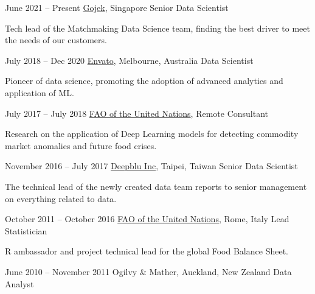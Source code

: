 \documentclass{tccv}
\begin{document}
\begin{eventlist}

\item{June 2021 -- Present}
  {\href{https://www.gojek.com/}{Gojek}, Singapore}
  { Senior Data Scientist }

  Tech lead of the Matchmaking Data Science team, finding the best driver to
  meet the needs of our customers.

\item{July 2018 -- Dec 2020}
  {\href{https://envato.com/}{Envato}, Melbourne, Australia}
  {Data Scientist}

  Pioneer of data science, promoting the adoption of advanced
  analytics and application of ML.

\item{July 2017 -- July 2018}
  {\href{http://www.fao.org/home/en/}{FAO of the United Nations}, Remote}
  {Consultant}

  Research on the application of Deep Learning models for detecting
  commodity market anomalies and future food crises.
  
\item{November 2016 -- July 2017}
  {\href{http://deepblu.com/}{Deepblu Inc}, Taipei, Taiwan}
  {Senior Data Scientist}

  The technical lead of the newly created data team reports to senior management
  on everything related to data.

\item{October 2011 -- October 2016}
  {\href{http://www.fao.org/home/en/}{FAO of the United Nations}, Rome, Italy}
  {Lead Statistician}

  R ambassador and project technical lead for the global Food Balance Sheet.\\
  
\item{June 2010 -- November 2011}
  {Ogilvy \& Mather, Auckland, New Zealand}
  {Data Analyst}


\end{eventlist}


\end{document}
